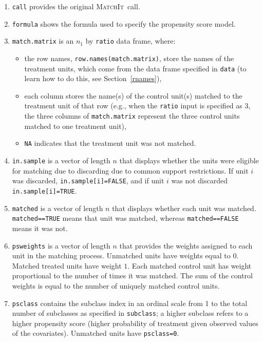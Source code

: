 \documentclass[oneside,letterpaper,titlepage]{article}
\newcommand{\MatchIt}{\textsc{MatchIt}}
\begin{document}
\begin{enumerate}
  
\item \texttt{call} provides the original \MatchIt\ call.
 
\item \texttt{formula} shows the formula used to specify the
  propensity score model.
  
\item \texttt{match.matrix} is an $n_1$ by \texttt{ratio} data frame,
  where:
  \begin{itemize}
  \item the row names, \texttt{row.names(match.matrix)}, store the
    names of the treatment units, which come from the data frame
    specified in \texttt{data} (to learn how to do this, see
    Section~\ref{rnames}),
  \item each column stores the name(s) of the control unit(s) matched
    to the treatment unit of that row (e.g., when the \texttt{ratio}
    input is specified as 3, the three columns of
    \texttt{match.matrix} represent the three control units matched to
    one treatment unit),
   \item \texttt{NA} indicates that the treatment unit was not
     matched.  
   \end{itemize}
   
 \item \texttt{in.sample} is a vector of length $n$ that displays
   whether the units were eligible for matching due to discarding due
   to common support restrictions.  If unit $i$ was discarded,
   \texttt{in.sample[i]=FALSE}, and if unit $i$ was not discarded
   \texttt{in.sample[i]=TRUE}.
   
 \item \texttt{matched} is a vector of length $n$ that displays
   whether each unit was matched.  \texttt{matched==TRUE} means that
   unit was matched, whereas \texttt{matched==FALSE} means it was not.
   
 \item \texttt{psweights} is a vector of length $n$ that provides the
   weights assigned to each unit in the matching process.  Unmatched
   units have weights equal to $0$. Matched treated units have weight
   $1$.  Each matched control unit has weight proportional to the
   number of times it was matched.  The sum of the control weights is
   equal to the number of uniquely matched control units.
   
 \item \texttt{psclass} contains the subclass index in an ordinal
   scale from 1 to the total number of subclasses as specified in
   \texttt{subclass}; a higher subclass refers to a higher propensity
   score (higher probability of treatment given observed values of the
   covariates).  Unmatched units have \texttt{psclass=0}.
   

\end{enumerate}
\end{document}
